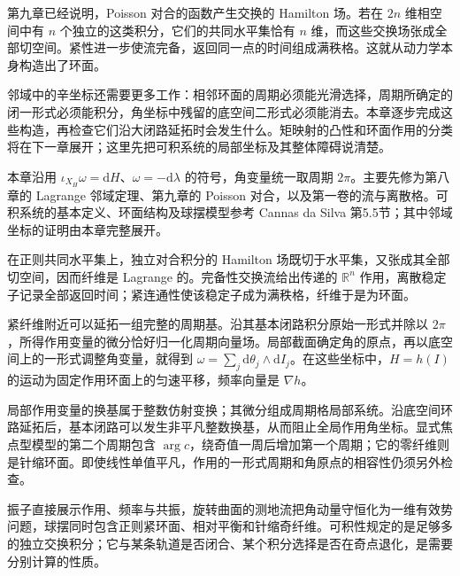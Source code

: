 第九章已经说明，Poisson 对合的函数产生交换的 Hamilton 场。若在 \(2n\) 维相空间中有 \(n\) 个独立的这类积分，它们的共同水平集恰有 \(n\) 维，而这些交换场张成全部切空间。紧性进一步使流完备，返回同一点的时间组成满秩格。这就从动力学本身构造出了环面。

\ProseParagraphBreak

邻域中的辛坐标还需要更多工作：相邻环面的周期必须能光滑选择，周期所确定的闭一形式必须能积分，角坐标中残留的底空间二形式必须能消去。本章逐步完成这些构造，再检查它们沿大闭路延拓时会发生什么。矩映射的凸性和环面作用的分类将在下一章展开；这里先把可积系统的局部坐标及其整体障碍说清楚。

\ProseParagraphBreak

本章沿用 \(\iota_{X_H}\omega=\mathrm{d}H\)、\(\omega=-\mathrm{d}\lambda\) 的符号，角变量统一取周期 \(2\pi\)。主要先修为第八章的 Lagrange 邻域定理、第九章的 Poisson 对合，以及第一卷的流与离散格。可积系统的基本定义、环面结构及球摆模型参考 Cannas da Silva 第5.5节；其中邻域坐标的证明由本章完整展开。\cite[第150--153页]{Cannas2006Symplectic}






\begin{chaptersummary}
在正则共同水平集上，独立对合积分的 Hamilton 场既切于水平集，又张成其全部切空间，因而纤维是 Lagrange 的。完备性交换流给出传递的 \(\mathbb R^n\) 作用，离散稳定子记录全部返回时间；紧连通性使该稳定子成为满秩格，纤维于是为环面。

\ProseParagraphBreak

紧纤维附近可以延拓一组完整的周期基。沿其基本闭路积分原始一形式并除以 \(2\pi\)，所得作用变量的微分恰好归一化周期向量场。局部截面确定角的原点，再以底空间上的一形式调整角变量，就得到 \(\omega=\sum_j\mathrm{d}\theta_j\wedge\mathrm{d}I_j\)。在这些坐标中，\(H=h(I)\) 的运动为固定作用环面上的匀速平移，频率向量是 \(\nabla h\)。

\ProseParagraphBreak

局部作用变量的换基属于整数仿射变换；其微分组成周期格局部系统。沿底空间环路延拓后，基本闭路可以发生非平凡整数换基，从而阻止全局作用角坐标。显式焦点型模型的第二个周期包含 \(\arg c\)，绕奇值一周后增加第一个周期；它的零纤维则是针缩环面。即使线性单值平凡，作用的一形式周期和角原点的相容性仍须另外检查。

\ProseParagraphBreak

振子直接展示作用、频率与共振，旋转曲面的测地流把角动量守恒化为一维有效势问题，球摆同时包含正则紧环面、相对平衡和针缩奇纤维。可积性规定的是足够多的独立交换积分；它与某条轨道是否闭合、某个积分选择是否在奇点退化，是需要分别计算的性质。
\end{chaptersummary}

